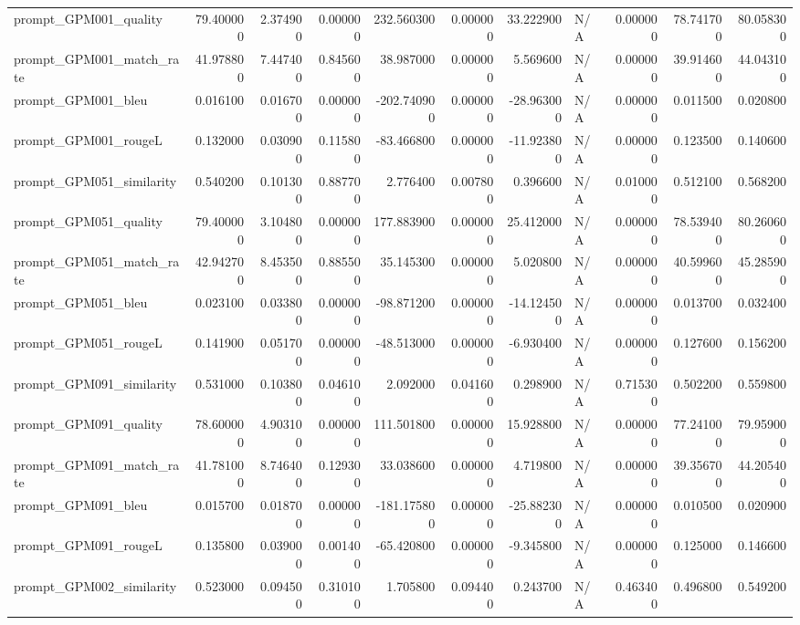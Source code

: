 \begin{tabular}{lrrrrrrlrrr}
prompt_GPM001_quality & 79.400000 & 2.374900 & 0.000000 & 232.560300 & 0.000000 & 33.222900 & N/A & 0.000000 & 78.741700 & 80.058300 \\
prompt_GPM001_match_rate & 41.978800 & 7.447400 & 0.845600 & 38.987000 & 0.000000 & 5.569600 & N/A & 0.000000 & 39.914600 & 44.043100 \\
prompt_GPM001_bleu & 0.016100 & 0.016700 & 0.000000 & -202.740900 & 0.000000 & -28.963000 & N/A & 0.000000 & 0.011500 & 0.020800 \\
prompt_GPM001_rougeL & 0.132000 & 0.030900 & 0.115800 & -83.466800 & 0.000000 & -11.923800 & N/A & 0.000000 & 0.123500 & 0.140600 \\
prompt_GPM051_similarity & 0.540200 & 0.101300 & 0.887700 & 2.776400 & 0.007800 & 0.396600 & N/A & 0.010000 & 0.512100 & 0.568200 \\
prompt_GPM051_quality & 79.400000 & 3.104800 & 0.000000 & 177.883900 & 0.000000 & 25.412000 & N/A & 0.000000 & 78.539400 & 80.260600 \\
prompt_GPM051_match_rate & 42.942700 & 8.453500 & 0.885500 & 35.145300 & 0.000000 & 5.020800 & N/A & 0.000000 & 40.599600 & 45.285900 \\
prompt_GPM051_bleu & 0.023100 & 0.033800 & 0.000000 & -98.871200 & 0.000000 & -14.124500 & N/A & 0.000000 & 0.013700 & 0.032400 \\
prompt_GPM051_rougeL & 0.141900 & 0.051700 & 0.000000 & -48.513000 & 0.000000 & -6.930400 & N/A & 0.000000 & 0.127600 & 0.156200 \\
prompt_GPM091_similarity & 0.531000 & 0.103800 & 0.046100 & 2.092000 & 0.041600 & 0.298900 & N/A & 0.715300 & 0.502200 & 0.559800 \\
prompt_GPM091_quality & 78.600000 & 4.903100 & 0.000000 & 111.501800 & 0.000000 & 15.928800 & N/A & 0.000000 & 77.241000 & 79.959000 \\
prompt_GPM091_match_rate & 41.781000 & 8.746400 & 0.129300 & 33.038600 & 0.000000 & 4.719800 & N/A & 0.000000 & 39.356700 & 44.205400 \\
prompt_GPM091_bleu & 0.015700 & 0.018700 & 0.000000 & -181.175800 & 0.000000 & -25.882300 & N/A & 0.000000 & 0.010500 & 0.020900 \\
prompt_GPM091_rougeL & 0.135800 & 0.039000 & 0.001400 & -65.420800 & 0.000000 & -9.345800 & N/A & 0.000000 & 0.125000 & 0.146600 \\
prompt_GPM002_similarity & 0.523000 & 0.094500 & 0.310100 & 1.705800 & 0.094400 & 0.243700 & N/A & 0.463400 & 0.496800 & 0.549200 \\

\end{tabular}
